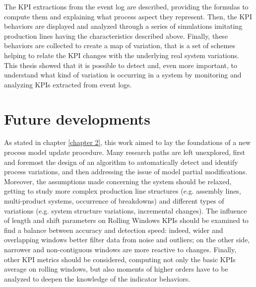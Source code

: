 The KPI extractions from the event log are described, providing the formulas to compute them and explaining what process aspect they represent. Then, the KPI behaviors are displayed and analyzed through a series of simulations imitating production lines having the characteristics described above. Finally, these behaviors are collected to create a map of variation, that is a set of schemes helping to relate the KPI changes with the underlying real system variations. \\
This thesis showed that it is possible to detect and, even more important, to understand what kind of variation is occurring in a system by monitoring and analyzing KPIs extracted from event logs. 
\section{Future developments}
As stated in chapter \ref{chapter 2}, this work aimed to lay the foundations of a new process model update procedure. Many research paths are left unexplored, first and foremost the design of an algorithm to automatically detect and identify process variations, and then addressing the issue of model partial modifications. Moreover, the assumptions made concerning the system should be relaxed, getting to study more complex production line structures (e.g. assembly lines, multi-product systems, occurrence of breakdowns) and different types of variations (e.g. system structure variations, incremental changes). The influence of length and shift parameters on Rolling Windows KPIs should be examined to find a balance between accuracy and detection speed: indeed, wider and overlapping windows better filter data from noise and outliers; on the other side, narrower and non-contiguous windows are more reactive to changes. Finally, other KPI metrics should be considered, computing not only the basic KPIs average on rolling windows, but also moments of higher orders have to be analyzed to deepen the knowledge of the indicator behaviors.